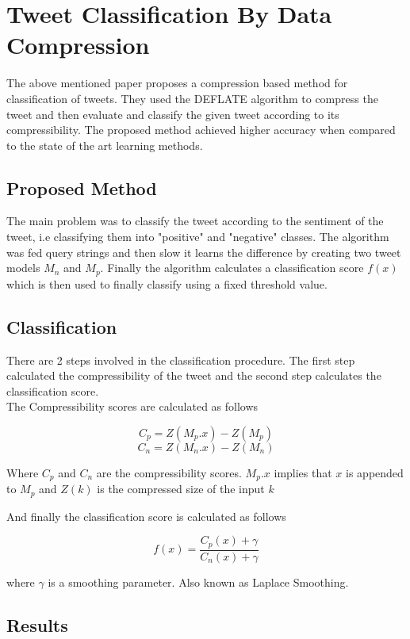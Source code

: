\documentclass{article}
\begin{document}
\section{Tweet Classification By Data Compression \cite{10.1145/2064448.2064473}}

The above mentioned paper proposes a compression based method for classification of tweets. They used the DEFLATE algorithm to compress the tweet and then evaluate and classify the given tweet according to its compressibility. The proposed method achieved higher accuracy when compared to the state of the art learning methods. 

\subsection{Proposed Method}

The main problem was to classify the tweet according to the sentiment of the tweet, i.e classifying them into "positive" and "negative" classes. The algorithm was fed query strings and then slow it learns the difference by creating two tweet models $M_n$ and $M_p$. Finally the algorithm calculates a classification score $f(x)$ which is then used to finally classify using a fixed threshold value.

\subsection{Classification}

There are 2 steps involved in the classification procedure. The first step calculated the compressibility of the tweet and the second step calculates the classification score. \\ 

The Compressibility scores are calculated as follows  \cite{10.1145/2064448.2064473}

$$C_p = Z(M_p . x) - Z(M_p)$$
$$C_n = Z(M_n . x) - Z(M_n)$$

Where $C_p$ and $C_n$ are the compressibility scores. $M_p . x$ implies that $x$ is appended to $M_p$ and $Z(k)$ is the compressed size of the input $k$ 

And finally the classification score is calculated as follows

$$
f(x) = \frac{C_p(x) + \gamma}{C_n(x) + \gamma}
$$

where $\gamma$ is a smoothing parameter. Also known as Laplace Smoothing. 

\subsection{Results}
\end{document}
